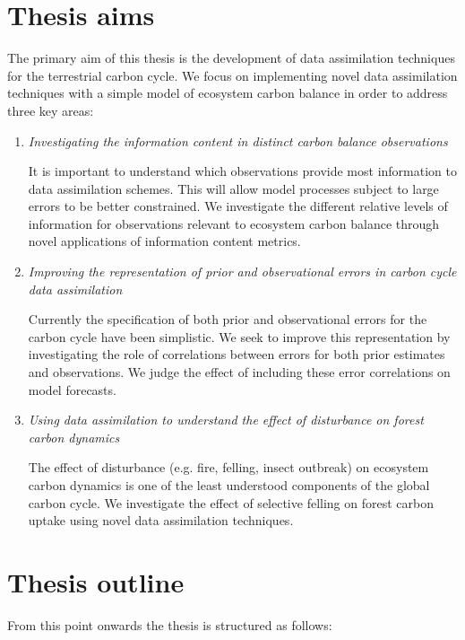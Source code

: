 
\section{Thesis aims}

The primary aim of this thesis is the development of data assimilation techniques for the terrestrial carbon cycle. We focus on implementing novel data assimilation techniques with a simple model of ecosystem carbon balance in order to address three key areas:

\begin{enumerate}
\item \textit{Investigating the information content in distinct carbon balance observations}

It is important to understand which observations provide most information to data assimilation schemes. This will allow model processes subject to large errors to be better constrained. We investigate the different relative levels of information for observations relevant to ecosystem carbon balance through novel applications of information content metrics.

\item \textit{Improving the representation of prior and observational errors in carbon cycle data assimilation}

Currently the specification of both prior and observational errors for the carbon cycle have been simplistic. We seek to improve this representation by investigating the role of correlations between errors for both prior estimates and observations. We judge the effect of including these error correlations on model forecasts.
  
\item \textit{Using data assimilation to understand the effect of disturbance on forest carbon dynamics}

The effect of disturbance (e.g. fire, felling, insect outbreak) on ecosystem carbon dynamics is one of the least understood components of the global carbon cycle. We investigate the effect of selective felling on forest carbon uptake using novel data assimilation techniques.
\end{enumerate}

\section{Thesis outline}

From this point onwards the thesis is structured as follows:

